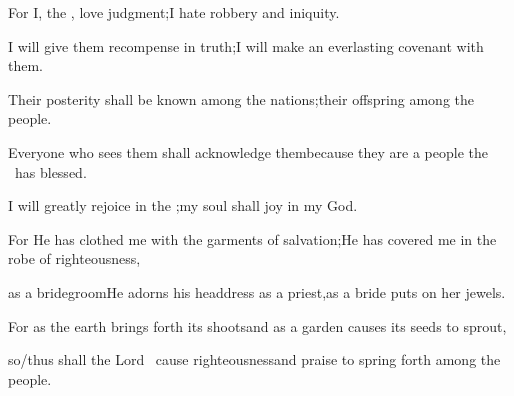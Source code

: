 \begin{inparaenum}
  \pb{} For I, the \lord, love judgment;\pa{}I hate robbery and iniquity.%

  \pc{}I will give them recompense in truth;\pa{}I will make an everlasting covenant with them.%

  \pb{} Their posterity shall be known among the nations;\pa{}their offspring  among the people.%

  \pc{}Everyone who sees them shall acknowledge them\pa{}because they are a people the \lord\ has blessed.%

  \pa{} I will greatly rejoice in the \lord;\pa{}my soul shall joy in my God.%

  \pb{}For He has clothed me with the garments of salvation;\pa{}He has covered me in the robe of righteousness,%

  \pb{}as a bridegroom\pa{}He adorns his headdress as a priest,\pa{}as a bride puts on her jewels.%

  \pa{} For as the earth brings forth its shoots\pa{}and as a garden causes its seeds to sprout,%

  \pb{}so/thus shall the Lord \god\ cause righteousness\pa{}and praise to spring forth among the people.%
\end{inparaenum}
